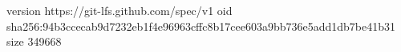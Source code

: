 version https://git-lfs.github.com/spec/v1
oid sha256:94b3ccecab9d7232eb1f4e96963cffc8b17cee603a9bb736e5add1db7be41b31
size 349668
